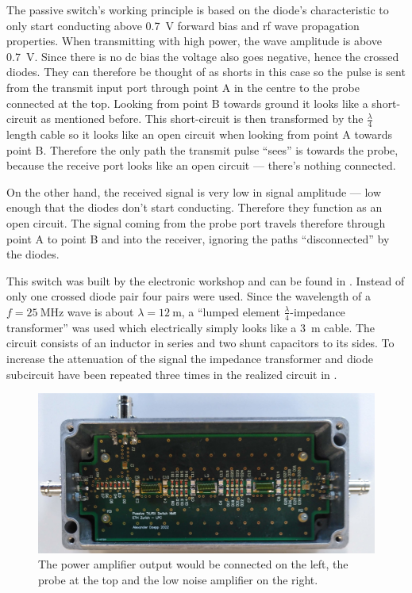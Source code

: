 The passive switch's working principle is based on the diode's characteristic to only start conducting above \qty{0.7}{\volt} forward bias and \acrshort{rf} wave propagation properties. When transmitting with high power, the wave amplitude is above \qty{0.7}{\volt}. Since there is no \acrshort{dc} bias the voltage also goes negative, hence the crossed diodes. They can therefore be thought of as shorts in this case so the pulse is sent from the transmit input port through point A in the centre to the probe connected at the top. Looking from point B towards ground it looks like a short-circuit as mentioned before. This short-circuit is then transformed by the \(\frac{\lambda}{4}\) length cable so it looks like an open circuit when looking from point A towards point B. Therefore the only path the transmit pulse \enquote{sees} is towards the probe, because the receive port looks like an open circuit --- there's nothing connected.

On the other hand, the received signal is very low in signal amplitude --- low enough that the diodes don't start conducting. Therefore they function as an open circuit. The signal coming from the probe port travels therefore through point A to point B and into the receiver, ignoring the paths \enquote{disconnected} by the diodes.

This switch was built by the electronic workshop and can be found in . Instead of only one crossed diode pair four pairs were used. Since the wavelength of a \(f = \qty{25}{\mega\hertz}\) wave is about \(\lambda{} = \qty{12}{\metre}\), a \enquote{lumped element \(\frac{\lambda}{4}\)-impedance transformer} was used which electrically simply looks like a \qty{3}{\metre} cable. The circuit consists of an inductor in series and two shunt capacitors to its sides. To increase the attenuation of the signal the impedance transformer and diode subcircuit have been repeated three times in the realized circuit in .

\begin{figure}[hbt]
    \centering
    \includegraphics[width=\textwidth]{images/passive_tr_switch_assembled.jpg}
    \caption{ The power amplifier output would be connected on the left, the probe at the top and the low noise amplifier on the right.}
\end{figure}


